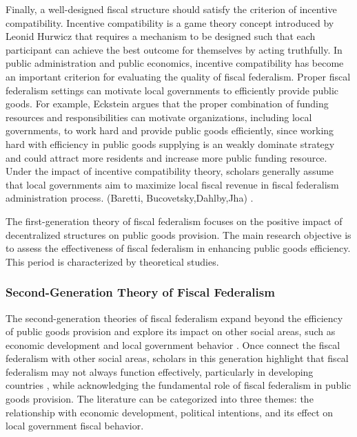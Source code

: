 Finally, a well-designed fiscal structure should satisfy the criterion of incentive compatibility. Incentive compatibility is a game theory concept introduced by Leonid Hurwicz \cite{hurwicz1973design} that requires a mechanism to be designed such that each participant can achieve the best outcome for themselves by acting truthfully. In public administration and public economics, incentive compatibility has become an important criterion for evaluating the quality of fiscal federalism. Proper fiscal federalism settings can motivate local governments to efficiently provide public goods. For example, Eckstein \cite{eckstein1958water} argues that the proper combination of funding resources and responsibilities can motivate organizations, including local governments, to work hard and provide public goods efficiently, since working hard with efficiency in public goods supplying is an weakly dominate strategy and could attract more residents and increase more public funding resource. Under the impact of incentive compatibility theory, scholars generally assume that local governments aim to maximize local fiscal revenue in fiscal federalism administration process. (Baretti, Bucovetsky,Dahlby,Jha) \cite{baretti2002tax,bucovetsky2006efficiency,dahlby2011marginal,jha2000tax}.

The first-generation theory of fiscal federalism focuses on the positive impact of decentralized structures on public goods provision. The main research objective is to assess the effectiveness of fiscal federalism in enhancing public goods efficiency. This period is characterized by theoretical studies.

\subsubsection{Second-Generation Theory of Fiscal Federalism}

The second-generation theories of fiscal federalism expand beyond the efficiency of public goods provision and explore its impact on other social areas, such as economic development \cite{cai2005does,barro1991economic} and local government behavior \cite{jin2005regional}. Once connect the fiscal federalism with other social areas, scholars in this generation highlight that fiscal federalism may not always function effectively, particularly in developing countries \cite{keen1997fiscal,treisman2002decentralization,bardhan2002decentralization,bucovetsky2005public}, while acknowledging the fundamental role of fiscal federalism in public goods provision. The literature can be categorized into three themes: the relationship with economic development, political intentions, and its effect on local government fiscal behavior.

